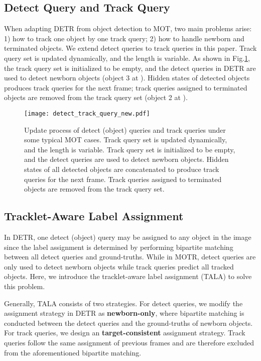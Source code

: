 \documentclass[runningheads]{llncs}
\begin{document}
\subsection{Detect Query and Track Query}
When adapting DETR from object detection to MOT, two main problems arise: 1) how to track one object by one track query; 2) how to handle newborn and terminated objects.
We extend detect queries to track queries in this paper.
Track query set is updated dynamically, and the length is variable.
As shown in Fig.\;\ref{detect_track_query}, the track query set is initialized to be empty, and the detect queries in DETR are used to detect newborn objects (object 3 at ). Hidden states of detected objects produces track queries for the next frame; track queries assigned to terminated objects are removed from the track query set (object 2 at ).


\begin{figure}[t]
  \centering
  \texttt{[image: detect\_track\_query\_new.pdf]}
  \caption{Update process of detect (object) queries and track queries under some typical MOT cases. Track query set is updated dynamically, and the length is variable. Track query set is initialized to be empty, and the detect queries are used to detect newborn objects. Hidden states of all detected objects are concatenated to produce track queries for the next frame. Track queries assigned to terminated objects are removed from the track query set.}
  \label{detect_track_query}
\end{figure}

\subsection{Tracklet-Aware Label Assignment}
\label{tala}
In DETR, one detect (object) query may be assigned to any object in the image since the label assignment is determined by performing bipartite matching between all detect queries and ground-truths. While in MOTR, detect queries are only used to detect newborn objects while track queries predict all tracked objects. Here, we introduce the tracklet-aware label assignment (TALA) to solve this problem.

Generally, TALA consists of two strategies. For detect queries, we modify the assignment strategy in DETR as \textbf{newborn-only}, where bipartite matching is conducted between the detect queries and the ground-truths of newborn objects. For track queries, we design an \textbf{target-consistent} assignment strategy. Track queries follow the same assignment of previous frames and are therefore excluded from the aforementioned bipartite matching.
\end{document}
